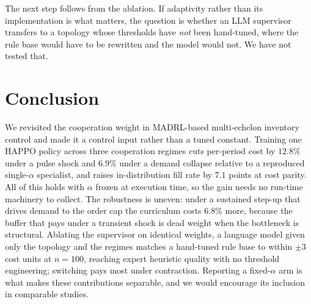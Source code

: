 \documentclass[conference]{IEEEtran}
\begin{document}
The next step follows from the ablation. If adaptivity rather than its
implementation is what matters, the question is whether an LLM supervisor
transfers to a topology whose thresholds have \emph{not} been hand-tuned,
where the rule base would have to be rewritten and the model would not. We
have not tested that.

\section{Conclusion}

We revisited the cooperation weight in MADRL-based multi-echelon inventory
control and made it a control input rather than a tuned constant. Training
one HAPPO policy across three cooperation regimes cuts per-period cost by
$12.8\%$ under a pulse shock and $6.9\%$ under a demand collapse relative to
a reproduced single-$\alpha$ specialist, and raises in-distribution fill
rate by $7.1$ points at cost parity. All of this holds with $\alpha$ frozen
at execution time, so the gain needs no run-time machinery to collect. The robustness is
uneven: under a sustained step-up that drives demand to the order cap the
curriculum costs $6.8\%$ more, because the buffer that pays under a
transient shock is dead weight when the bottleneck is structural. Ablating
the supervisor on identical weights, a language model given only the
topology and the regimes matches a hand-tuned rule base to within $\pm 3$
cost units at $n=100$, reaching expert heuristic quality with no threshold
engineering; switching pays most under contraction. Reporting a fixed-$\alpha$
arm is what makes these contributions separable, and we would encourage its
inclusion in comparable studies.
\end{document}
